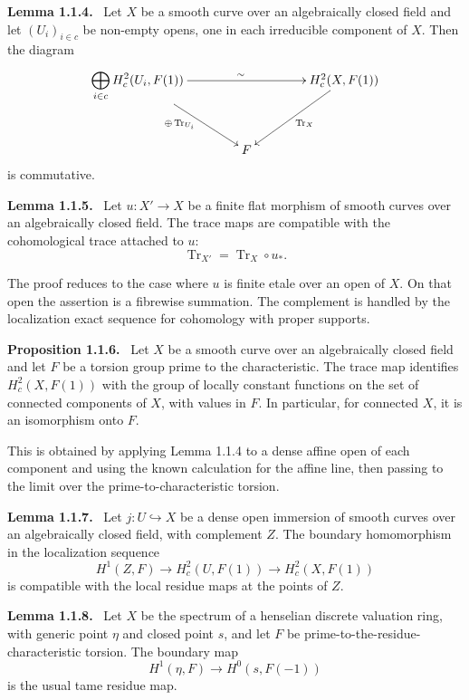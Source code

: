 \documentclass[12pt]{article}
\newenvironment{statement}[1]{\par\medskip\noindent\textbf{#1.}\ }{\par\medskip}
\begin{document}
\begin{statement}{Lemma 1.1.4}
Let \(X\) be a smooth curve over an algebraically closed field and let \((U_i)_{i\in c}\) be non-empty opens, one in each irreducible component of \(X\). Then the diagram
\[
\xymatrix@C=1.4cm@R=1.2cm{
\displaystyle\bigoplus_{i\in c}H^2_c(U_i,F(1))\ar[rr]^{\sim}\ar[rd]_{\oplus\operatorname{Tr}_{U_i}}&&H^2_c(X,F(1))\ar[ld]^{\operatorname{Tr}_X}\\
&F&
}
\]
is commutative.
\end{statement}

\begin{statement}{Lemma 1.1.5}
Let \(u:X'\to X\) be a finite flat morphism of smooth curves over an algebraically closed field. The trace maps are compatible with the cohomological trace attached to \(u\):
\[
\operatorname{Tr}_{X'}=\operatorname{Tr}_X\circ u_*.
\]
\end{statement}

The proof reduces to the case where \(u\) is finite etale over an open of \(X\). On that open the assertion is a fibrewise summation. The complement is handled by the localization exact sequence for cohomology with proper supports.

\begin{statement}{Proposition 1.1.6}
Let \(X\) be a smooth curve over an algebraically closed field and let \(F\) be a torsion group prime to the characteristic. The trace map identifies \(H^2_c(X,F(1))\) with the group of locally constant functions on the set of connected components of \(X\), with values in \(F\). In particular, for connected \(X\), it is an isomorphism onto \(F\).
\end{statement}

This is obtained by applying Lemma 1.1.4 to a dense affine open of each component and using the known calculation for the affine line, then passing to the limit over the prime-to-characteristic torsion.

\begin{statement}{Lemma 1.1.7}
Let \(j:U\hookrightarrow X\) be a dense open immersion of smooth curves over an algebraically closed field, with complement \(Z\). The boundary homomorphism in the localization sequence
\[
H^1(Z,F)\to H^2_c(U,F(1))\to H^2_c(X,F(1))
\]
is compatible with the local residue maps at the points of \(Z\).
\end{statement}

\begin{statement}{Lemma 1.1.8}
Let \(X\) be the spectrum of a henselian discrete valuation ring, with generic point \(\eta\) and closed point \(s\), and let \(F\) be prime-to-the-residue-characteristic torsion. The boundary map
\[
H^1(\eta,F)\to H^0(s,F(-1))
\]
is the usual tame residue map.
\end{statement}
\end{document}
